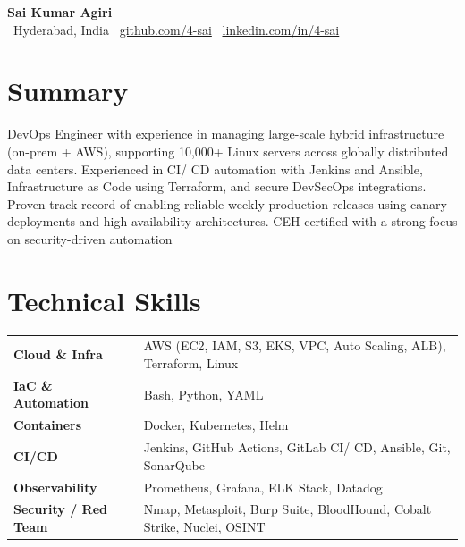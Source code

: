 \documentclass[10pt, letterpaper]{article}
\begin{document}
\pagestyle{empty}

\begin{center}
  {\LARGE\bfseries Sai Kumar Agiri}\\[4pt]
  {\color{mutedtext}\small
    ~Hyderabad, India \quad
    ~\href{https://github.com/4-sai}{github.com/4-sai} \quad
    ~\href{https://linkedin.com/in/4-sai}{linkedin.com/in/4-sai}
  }
\end{center}

\vspace{2pt}

\section{Summary}
DevOps Engineer with experience in managing large-scale hybrid infrastructure (on-prem + AWS), supporting 10,000+ Linux servers across globally distributed data centers. Experienced in CI/ CD automation with Jenkins and Ansible, Infrastructure as Code using Terraform, and secure DevSecOps integrations. Proven track record of enabling reliable weekly production releases using canary deployments and high-availability architectures. CEH-certified with a strong focus on security-driven automation

\section{Technical Skills}

\begin{tabularx}{\textwidth}{@{}lX@{}}
  \textbf{Cloud \& Infra}   & AWS (EC2, IAM, S3, EKS, VPC, Auto Scaling, ALB), Terraform, Linux \\[2pt]
  \textbf{IaC \& Automation} & Bash, Python, YAML \\[2pt]
  \textbf{Containers}        & Docker, Kubernetes, Helm \\[2pt]
  \textbf{CI/CD}             & Jenkins, GitHub Actions, GitLab CI/ CD, Ansible, Git, SonarQube \\[2pt]
  \textbf{Observability}     & Prometheus, Grafana, ELK Stack, Datadog \\[2pt]
  \textbf{Security / Red Team} & Nmap, Metasploit, Burp Suite, BloodHound, Cobalt Strike, Nuclei, OSINT \\[2pt]
\end{tabularx}
\end{document}
